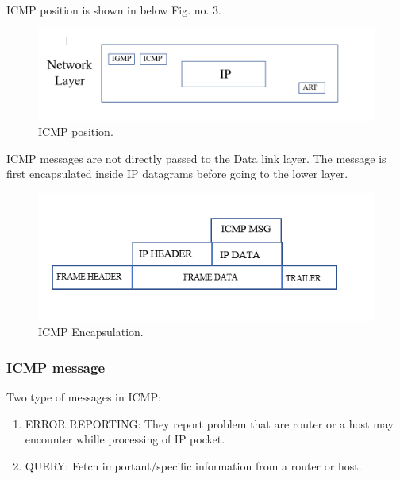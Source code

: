 \documentclass[12pt,a4paper]{article}
\begin{document}
ICMP position is shown in below  Fig. no. 3. 
\begin{figure}[h]
 		\centering
				\includegraphics[scale=0.5]{1.3.png}	
			\caption{ICMP position.}
			\label{fig:AP}
	\end{figure}
ICMP messages are not directly passed to the Data link layer. The message is first encapsulated inside IP datagrams before going to the lower layer.
\begin{figure}[h]
 		\centering
				\includegraphics[]{1.4.png}	
			\caption{ICMP Encapsulation.}
			\label{fig:AP}
	\end{figure}
\subsubsection {ICMP message}
Two type of messages in ICMP:
 \begin{enumerate}
\item ERROR REPORTING: They report problem that are router or a host may encounter whille processing of IP pocket.
\item QUERY: Fetch important/specific information from a router or host.
\end{enumerate}

 
\end{document}
